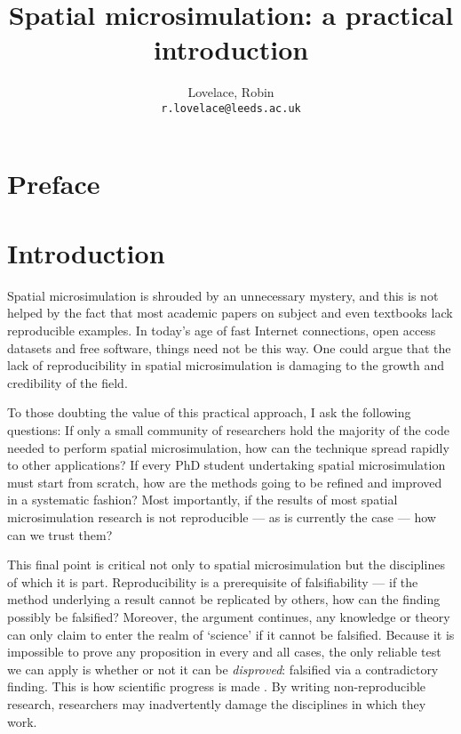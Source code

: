\documentclass[a5paper, 11pt, twoside]{book}  %
\begin{document}
 
\title{Spatial microsimulation: a practical introduction}
\pagestyle{myheadings}
\author{Lovelace, Robin\\
\texttt{r.lovelace@leeds.ac.uk}}
\maketitle

\tableofcontents

\chapter{Preface}

\chapter{Introduction}

Spatial microsimulation is shrouded by an unnecessary mystery, and this is not
helped by the fact that most academic papers on subject and even textbooks
lack reproducible examples. In today's age of fast
Internet connections, open access datasets and free software,
things need not be this way. One could argue that the lack of
reproducibility in spatial microsimulation is damaging to the growth
and credibility of the field.

To those doubting the value of this practical approach, I ask the following
questions: If only a small community of researchers hold the majority of the
code needed to perform spatial microsimulation, how can the technique spread
rapidly to other applications? If every PhD student undertaking spatial
microsimulation must start from scratch, how are the methods going to be
refined and improved in a systematic fashion? Most importantly, if the results
of most spatial microsimulation research is not reproducible --- as is currently
the case --- how can we trust them?

This final point is critical not only to spatial microsimulation but the
disciplines of which it is part. Reproducibility is a prerequisite of
falsifiability --- if the method
underlying a result cannot be replicated by others, how can the finding
possibly be falsified? Moreover, the argument continues, any knowledge or
theory can only claim to enter the realm of `science' if it cannot be falsified.
Because it is impossible to prove any proposition in every and all cases, the
only reliable test we can apply is whether or not it can be \emph{disproved}:
falsified via a contradictory finding. This is how scientific progress is made
\citep{Popper1959}. By writing non-reproducible research, researchers may
inadvertently damage the disciplines in which they work. %
\end{document}
